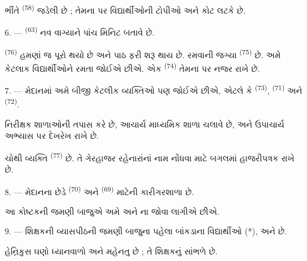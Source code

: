 ભીંતે  \textsuperscript{(58)} જડેલી છે ; તેમના
પર વિદ્યાર્થીઓની ટોપીઓ અને કોટ લટકે છે.

\VUsaut{5.2mm}
\VUsaut{3.6mm}

6. ---  \textsuperscript{(63)} નવ વાગ્યાને પાંચ મિનિટ
બતાવે છે.

 \textsuperscript{(76)} હમણાં જ પૂરો થયો છે અને પાઠ
ફરી શરૂ થાય છે. રમવાની જગ્યા  \textsuperscript{(75)}
છે. અમે કેટલાક વિદ્યાર્થીઓને રમતા જોઈએ છીએ. એક 
\textsuperscript{(74)} તેમના પર નજર રાખે છે.

7. --- મેદાનમાં અમે બીજી કેટલીક વ્યક્તિઓ પણ જોઈએ છીએ, એટલે કે
 \textsuperscript{(73)}, 
\textsuperscript{(71)} અને  \textsuperscript{(72)}.

નિરીક્ષક શાળાઓની તપાસ કરે છે, આચાર્ય માધ્યમિક શાળા ચલાવે છે, અને
ઉપાચાર્ય અભ્યાસ પર દેખરેખ રાખે છે.

ચોથી વ્યક્તિ  \textsuperscript{(77)} છે. તે ગેરહાજર
રહેનારાંનાં નામ નોંધવા માટે બગલમાં હાજરીપત્રક રાખે છે.

8. --- મેદાનના છેડે  \textsuperscript{(70)} અને
 \textsuperscript{(69)} માટેની કારીગરશાળા છે.

આ કોષ્ટકની જમણી બાજુએ અમે  અને ના
 જોવા લાગીએ છીએ.


\VUsaut{2.4mm}

\VUsaut{3.0mm}

9. --- શિક્ષકની વ્યાસપીઠની જમણી બાજુના પહેલા બાંકડાના વિદ્યાર્થીઓ
 (*),  અને  છે.

હેન્રિકુસ ઘણો ધ્યાનવાળો અને મહેનતુ છે ; તે શિક્ષકનું સાંભળે છે.

